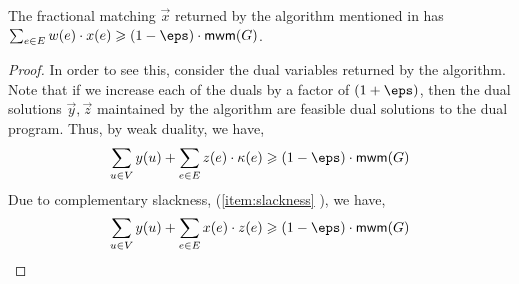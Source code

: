 \begin{lemma2}
The fractional matching $\vec{x}$ returned by the algorithm mentioned in  has $\sum_{e\in E}w(e)\cdot x(e)\geqslant (1-\eps)\cdot \textsf{mwm}(G)$.
\end{lemma2}

\begin{proof}
    In order to see this, consider the dual variables returned by the algorithm. Note that if we increase each of the duals by a factor of $(1+\eps)$, then the dual solutions $\vec{y},\vec{z}$ maintained by the algorithm are feasible dual solutions to the dual program. Thus, by weak duality, we have,
    \begin{align*}
        \sum_{u\in V}y(u)+\sum_{e\in E} z(e)\cdot \kappa(e)\geqslant (1-\eps)\cdot \textsf{mwm}(G)
    \end{align*}
    Due to complementary slackness, (\ref{item:slackness}
    ), we have,
    \begin{align*}
        \sum_{u\in V} y(u) +\sum_{e\in E} x(e)\cdot z(e) \geqslant (1-\eps)\cdot \textsf{mwm}(G)
    \end{align*}
\end{proof}


